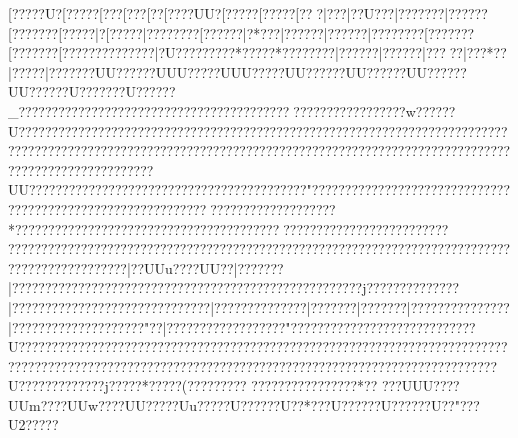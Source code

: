 {{{{{{{{{{{{{{{{{{{{{{{{{{{{{{{{{{{{{{{{{{{{{{{{{{{{{{{{{{{{{{{{{{{{{{{{{{{{{{{{{{{{{{{{{{{{{{{{{{{{{{{{{{{{{{{{{{{{{{{{{{{{{{{{{{{{{{{{{{{{{{{{{{{{{{{{{{{{{{{{{{{{{{{{{{{{{{{{{{{{{{{{{{{{{{{{{{{{{{{{{{{{{{{{{{{{{{{{{{{{{{{{{{{{{{{{{{{{{{{{{{{{{{{{{{{{{{{{{{{{{{{{{{{{{{{{{{{{{{{{{{{{{{{{{{{{{{{{{{{{{{{{{{{{{{{{{{{{{{{{{{{{{{{{{{{{{{{{{{{{{{{{{{{{{{{{{{{{{{{{{{{{{{{{{{{{{{{{{{{{{{{{{{{{{{{{{{{{{{{{{{{{{{{{{{{{{{{{{{{{{{{{{{{{{{{{{{{{{{{{{{{{{{{{{{{{{{{{{{{{{{{{{{{{{{{{{{{{{{{{{{{{{{{{{{{{{{{{{{{{{{{{{{{{{{{{{{{{{{{{{{{{{{{{{{{{{{{{{{{{{{{{{{{{{{{{{{{{{{{{{{{{{{{{{{{{{{{{{[?{????U{?[???? {?[?? {?[?? {?[?? [?{???UU{?[???? {?[???? {?[??  {?|?  ??|?{?U???|?{?????{?|? ?????[???????[?????|?[?????|?{???????[?????{?|?*???|?{?????|?{?????|?{???????[???????[???????[???????{???????|?U?????{????*??{???* ??{???? ??|???? ??|???? ??|??? ??|???* ??|???  ??|???  ????UU??????UUU?????UUU?????UU??????UU??????UU??????UU??????U???????U??????_??????????????????????????????????????????????????????????w??????U???????????????????????????????????????????????????????????????????????????????????????????????????????? ?????? ?????? ?????? ????????????????????? ???? ????????????? ????????????UU????  ????????????? ?????????????? ???????????"?????????????????????????????????????????? ???????????????????????????????? ?????*?????? ????????????? ????????????????????? ?????  ?????  ?????  ?????  ????? ????  ????  ?????? ?????????????? ??????????????????????????????????????????????????????{?{???  {?{???  {?{?    {?{?    |?{?UUu???{?UU??|?{?????{?|???????{???????{???????{?????{?????????{???????{?????{??????j??{???????{?????|?????????{???????{???????{???????|???????{???????|???????|???????|???????????????|????????????????????"??|??????????????????"????????????????????????????U????????????????????????????????????????????????????????????????????????????????????????????????????????????????????????????????????????????????????U?????????????j?????*?????(????? ????
 ????  ????   ????   ????* ??
   ???UUU????UUm????UUw????UU?????Uu?????U??????U??*???U??????U??????U??"???U2? ????
}}}}}}}}}}}}}}}}}}}}}}}}}}}}}}}}}}}}}}}}}}}}}}}}}}}}}}}}}}}}}}}}}}}}}}}}}}}}}}}}}}}}}}}}}}}}}}}}}}}}}}}}}}}}}}}}}}}}}}}}}}}}}}}}}}}}}}}}}}}}}}}}}}}}}}}}}}}}}}}}}}}}}}}}}}}}}}}}}}}}}}}}}}}}}}}}}}}}}}}}}}}}}}}}}}}}}}}}}}}}}}}}}}}}}}}}}}}}}}}}}}}}}}}}}}}}}}}}}}}}}}}}}}}}}}}}}}}}}}}}}}}}}}}}}}}}}}}}}}}}}}}}}}}}}}}}}}}}}}}}}}}}}}}}}}}}}}}}}}}}}}}}}}}}}}}}}}}}}}}}}}}}}}}}}}}}}}}}}}}}}}}}}}}}}}}}}}}}}}}}}}}}}}}}}}}}}}}}}}}}}}}}}}}}}}}}}}}}}}}}}}}}}}}}}}}}}}}}}}}}}}}}}}}}}}}}}}}}}}}}}}}}}}}}}}}}}}}}}}}}}}}}}}}}}}}}}}}}}}}}}}}}}}}}}}}}}}}}}}}}}}}}}}}}}}}}}}}}}}}}}}}}}}}}}}}}}}}}}}}}}}}}}}}}}}}}}}}}}}}}}}}}}}}}}}}}}}}}}}}}}}}}
